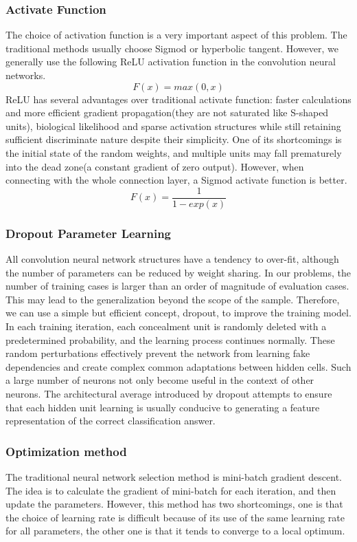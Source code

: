 \subsubsection{Activate Function}
The choice of activation function is a very important aspect of this problem. The traditional methods usually choose Sigmod or hyperbolic tangent. However, we generally use the following ReLU activation function in the convolution neural networks.
\begin{equation}
F(x) = max (0, x)
\end{equation}
ReLU has several advantages over traditional activate function: faster calculations and more efficient gradient propagation(they are not saturated like S-shaped units), biological likelihood and sparse activation structures while still retaining sufficient discriminate nature despite their simplicity. One of its shortcomings is the initial state of the random weights, and multiple units may fall prematurely into the dead zone(a constant gradient of zero output). However, when connecting with the whole connection layer, a Sigmod activate function is better.
\begin{equation}
F(x) = \frac{1}{1-exp(x)}
\end{equation}

\subsubsection{Dropout Parameter Learning}
All convolution neural network structures have a tendency to over-fit, although the number of parameters can be reduced by weight sharing. In our problems, the number of training cases is larger than an order of magnitude of evaluation cases. This may lead to the generalization beyond the scope of the sample. Therefore, we can use a simple but efficient concept, dropout, to improve the training model. In each training iteration, each concealment unit is randomly deleted with a predetermined probability, and the learning process continues normally. These random perturbations effectively prevent the network from learning fake dependencies and create complex common adaptations between hidden cells. Such a large number of neurons not only become useful in the context of other neurons. The architectural average introduced by dropout attempts to ensure that each hidden unit learning is usually conducive to generating a feature representation of the correct classification answer.

\subsubsection{Optimization method}
The traditional neural network selection method is mini-batch gradient descent. The idea is to calculate the gradient of mini-batch for each iteration, and then update the parameters. However, this method has two shortcomings, one is that the choice of learning rate is difficult because of its use of the same learning rate for all parameters, the other one is that it tends to converge to a local optimum.


